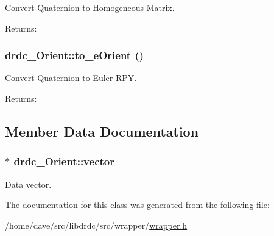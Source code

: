 Convert Quaternion to Homogeneous Matrix. 

\begin{Desc}
\item[Returns:]\end{Desc}
\hypertarget{classdrdc__Orient_408dbcbc5a32fd60251e5870929d2b90}{
\subsubsection[to\_\-eOrient]{ drdc\_\-Orient::to\_\-eOrient ()}}
\label{classdrdc__Orient_408dbcbc5a32fd60251e5870929d2b90}


Convert Quaternion to Euler RPY. 

\begin{Desc}
\item[Returns:]\end{Desc}


\subsection{Member Data Documentation}
\hypertarget{classdrdc__Orient_c49c0144ecfa31793c1bd5134ced5c34}{
\subsubsection[vector]{$\ast$ {\bf drdc\_\-Orient::vector}}}
\label{classdrdc__Orient_c49c0144ecfa31793c1bd5134ced5c34}


Data vector. 



The documentation for this class was generated from the following file:\begin{CompactItemize}
\item 
/home/dave/src/libdrdc/src/wrapper/\hyperlink{wrapper_8h}{wrapper.h}\end{CompactItemize}
